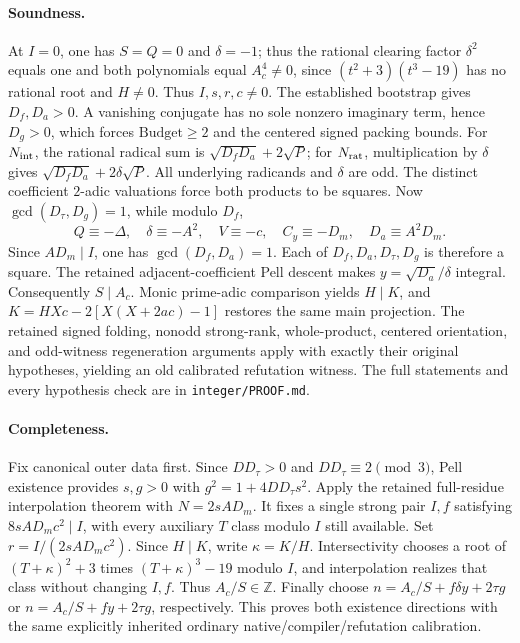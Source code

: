 \paragraph{Soundness.}
At $I=0$, one has $S=Q=0$ and $\delta=-1$; thus the rational
clearing factor $\delta^2$ equals one and both polynomials equal
$A_c^4\ne0$, since
$(t^2+3)(t^3-19)$ has no rational root and $H\ne0$.
Thus $I,s,r,c\ne0$. The established bootstrap gives $D_f,D_a>0$.
A vanishing conjugate has no sole nonzero imaginary term, hence $D_g>0$,
which forces $\mathrm{Budget}\ge2$ and the centered signed packing bounds.
For $N_{\rm int}$, the rational radical sum is
$\sqrt{D_fD_a}+2\sqrt P$; for $N_{\rm rat}$, multiplication by $\delta$
gives $\sqrt{D_fD_a}+2\delta\sqrt P$.
All underlying radicands and $\delta$ are odd. The distinct coefficient
$2$-adic valuations force both products to be squares.
Now $\gcd(D_\tau,D_g)=1$, while modulo $D_f$,
\[
 Q\equiv-\Delta,\quad \delta\equiv-A^2,\quad
 V\equiv-c,\quad C_y\equiv-D_m,\quad D_a\equiv A^2D_m.
\]
Since $AD_m\mid I$, one has $\gcd(D_f,D_a)=1$.
Each of $D_f,D_a,D_\tau,D_g$ is therefore a square.
The retained adjacent-coefficient Pell descent makes
$y=\sqrt{D_a}/\delta$ integral. Consequently $S\mid A_c$.
Monic prime-adic comparison yields $H\mid K$, and
$K=HXc-2[X(X+2ac)-1]$ restores the same main projection.
The retained signed folding, nonodd strong-rank, whole-product,
centered orientation, and odd-witness regeneration arguments apply with
exactly their original hypotheses, yielding an old calibrated refutation witness.
The full statements and every hypothesis check are in \texttt{integer/PROOF.md}.

\paragraph{Completeness.}
Fix canonical outer data first. Since $DD_\tau>0$ and
$DD_\tau\equiv2\pmod3$, Pell existence provides $s,g>0$ with
$g^2=1+4DD_\tau s^2$.
Apply the retained full-residue interpolation theorem with $N=2sAD_m$.
It fixes a single strong pair $I,f$ satisfying $8sAD_mc^2\mid I$,
with every auxiliary $T$ class modulo $I$ still available.
Set $r=I/(2sAD_mc^2)$. Since $H\mid K$, write $\kappa=K/H$.
Intersectivity chooses a root of $(T+\kappa)^2+3$ times
$(T+\kappa)^3-19$ modulo $I$, and interpolation realizes that class
without changing $I,f$. Thus $A_c/S\in\mathbb Z$.
Finally choose $n=A_c/S+f\delta y+2\tau g$ or
$n=A_c/S+fy+2\tau g$, respectively.
This proves both existence directions with the same explicitly inherited
ordinary native/compiler/refutation calibration.

